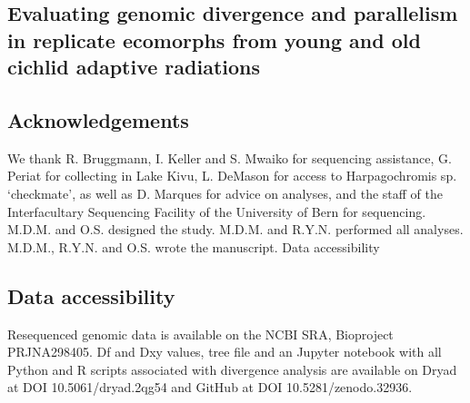 \begin{refsection}

\chapter{Evaluating genomic divergence and parallelism in replicate ecomorphs from young and old cichlid adaptive radiations}







\section{Acknowledgements}

We thank R. Bruggmann, I. Keller and S. Mwaiko for sequencing assistance, G. Periat for collecting in Lake Kivu, L. DeMason for access to Harpagochromis sp. ‘checkmate’, as well as D. Marques for advice on analyses, and the staff of the Interfacultary Sequencing Facility of the University of Bern for sequencing.
M.D.M. and O.S. designed the study. M.D.M. and R.Y.N. performed all analyses. M.D.M., R.Y.N. and O.S. wrote the manuscript.
Data accessibility

\section{Data accessibility}

Resequenced genomic data is available on the NCBI SRA, Bioproject PRJNA298405. Df and Dxy values, tree file and an Jupyter notebook with all Python and R scripts associated with divergence analysis are available on Dryad at DOI 10.5061/dryad.2qg54 and GitHub at DOI 10.5281/zenodo.32936.

\printbibliography[heading=subbibliography]

\end{refsection}